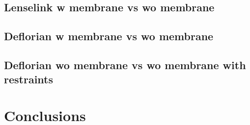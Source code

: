 \subsection{Lenselink w membrane vs wo membrane}

\lipsum[1][1-3]

\subsection{Deflorian w membrane vs wo membrane}

\lipsum[1][1-3]

\subsection{Deflorian wo membrane vs wo membrane with restraints}

\lipsum[1][1-3]

\section{Conclusions}
\lipsum[1][1-3]
